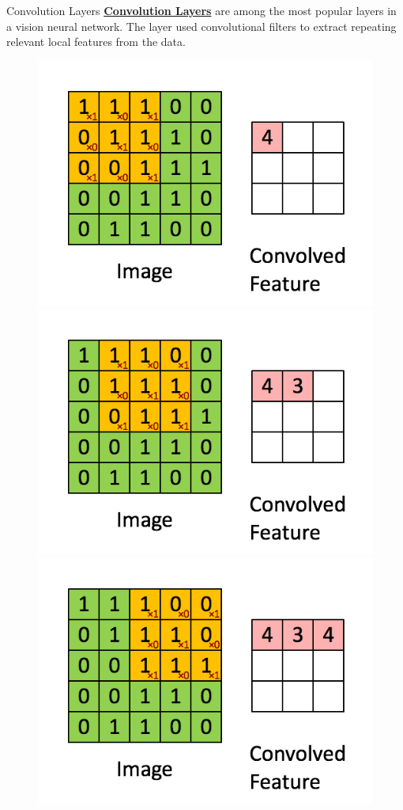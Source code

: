 \documentclass{beamer}
\begin{document}
\begin{frame}[fragile]{Convolution Layers}
    \href{https://pytorch.org/docs/stable/nn.html#convolution-layers}{\textbf{Convolution Layers}} are among the most popular layers in a vision neural network. The layer used convolutional filters to extract repeating relevant local features from the data.
    \begin{figure}
        \begin{overprint}
            \centering\includegraphics[width=.7\textwidth,height=\textheight,keepaspectratio]{figures/Convolution/Convolution-0.png}
            \centering\includegraphics[width=.7\textwidth,height=\textheight,keepaspectratio]{figures/Convolution/Convolution-1.png}
            \centering\includegraphics[width=.7\textwidth,height=\textheight,keepaspectratio]{figures/Convolution/Convolution-2.png}

\end{overprint}
\end{figure}
\end{frame}
\end{document}
